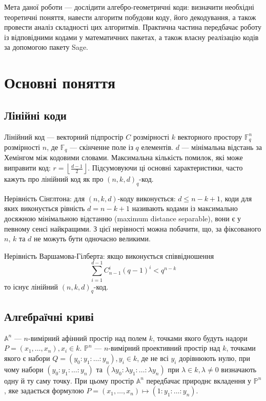 \documentclass[a4paper,14pt,oneside]{extarticle}
\begin{document}
Мета даної роботи --- дослідити алгебро-геометричні коди: визначити необхідні теоретичні поняття, навести алгоритм побудови коду, його декодування, а також провести аналіз складності цих алгоритмів. Практична частина передбачає роботу із відповідними кодами у математичних пакетах, а також власну реалізацію кодів за допомогою пакету Sage.

\pagebreak
\section{Основні поняття}

\subsection{Лінійні коди}
Лінійний код --- векторний підпростір $C$ розмірності $k$ векторного простору $\mathbb{F}_q^n$ розмірності $n$, де $\mathbb{F}_q$ --- скінченне поле із $q$ елементів. 
$d$ --- мінімальна відстань за Хемінгом між кодовими словами. Максимальна кількість помилок, які може виправити код: $r=\left \lfloor \frac{d-1}{2} \right \rfloor$. 
Підсумовуючи ці основні характеристики, часто кажуть про лінійний код як про $(n, k, d)_q$-код.

Нерівність Сінглтона: для $(n, k, d)$-коду виконується: $d \le n-k+1$, 
коди для яких виконується рівність $d = n-k+1$ називають кодами із максимально досяжною мінімальною відстанню (maximum distance separable), вони є у певному сенсі найкращими. 
З цієї нерівності можна побачити, що, за фіксованого $n$, $k$ та $d$ не можуть бути одночасно великими.

Нерівність Варшамова-Гілберта: якщо виконується співвідношення 
$$\sum_{i=1}^{d-1} C_{n-1}^i (q-1)^i < q^{n-k}$$
то існує лінійний $(n, k ,d)_q$-код.


\subsection{Алгебраїчні криві}
$\mathbb{A}^n$ --- $n$-вимірний афінний простір над полем $k$, точками якого будуть надори $P = (x_1, \dots, x_n), x_i \in k$. 
$\mathbb{P}^n$ --- $n$-вимірний проективний простір над $k$, точками якого є набори $Q=(y_0 : y_1 : \ldots : y_n), y_i \in k$, де не всі $y_i$ дорівнюють нулю,
при чому набори $(y_0 : y_1 : \ldots : y_n)$ та $(\lambda y_0 : \lambda y_1 : \ldots : \lambda y_n)$ при $\lambda \in k, \lambda \neq 0$ визначають одну й ту саму точку. 
При цьому простір $\mathbb{A}^n$ передбачає природнє вкладення у $\mathbb{P}^n$, яке задається формулою $P = (x_1, \dots, x_n) \mapsto (1: y_1 : \ldots : y_n)$.
\end{document}
